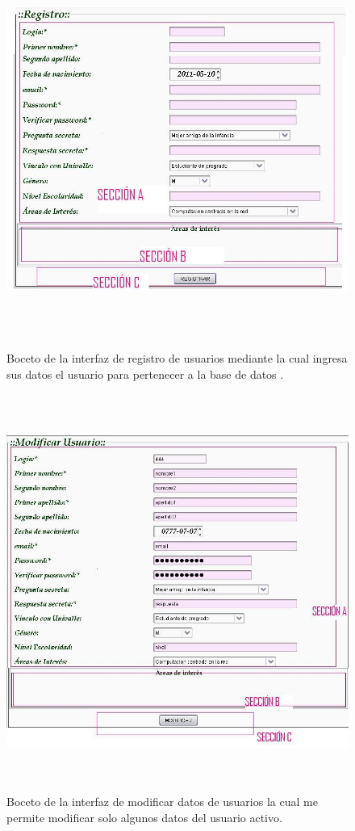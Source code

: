 \documentclass[]{article}
\begin{document}
\begin{figure}[h]
\includegraphics[width= 18cm , height= 13cm]{Bocetos/registro.jpg}
\caption{Boceto de la interfaz de registro de usuarios mediante la cual ingresa sus datos el usuario para pertenecer a la base de datos . }
\end{figure}

\begin{figure}[h]
\includegraphics[width= 18cm , height= 13cm]{Bocetos/modificarUsuarios.jpg}
\caption{Boceto de la interfaz de modificar datos de usuarios la cual me permite modificar solo algunos datos del usuario activo. }
\end{figure}
\end{document}
